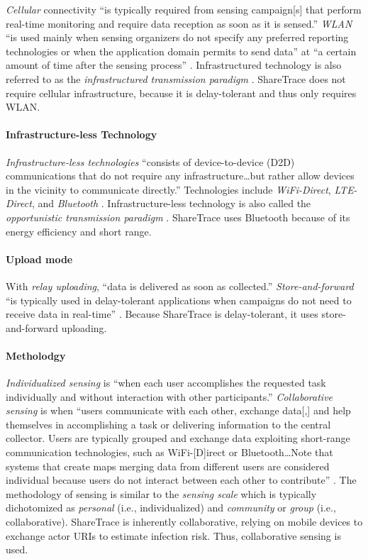 \emph{Cellular} connectivity ``is typically required from sensing campaign[s] that perform real-time monitoring and require data reception as soon as it is sensed.'' \emph{WLAN} ``is used mainly when sensing organizers do not specify any preferred reporting technologies or when the application domain permits to send data'' at ``a certain amount of time after the sensing process'' \citep{Capponi2019}. Infrastructured technology is also referred to as the \emph{infrastructured transmission paradigm} \citep{Ma2014}. ShareTrace does not require cellular infrastructure, because it is delay-tolerant and thus only requires WLAN.

\paragraph{Infrastructure-less Technology}

\emph{Infrastructure-less technologies} ``consists of device-to-device (D2D) communications that do not require any infrastructure{\ldots}but rather allow devices in the vicinity to communicate directly.'' Technologies include \emph{WiFi-Direct}, \emph{LTE-Direct}, and \emph{Bluetooth} \citep{Capponi2019}. Infrastructure-less technology is also called the \emph{opportunistic transmission paradigm} \citep{Ma2014}. ShareTrace uses Bluetooth because of its energy efficiency and short range.

\paragraph{Upload mode}

With \emph{relay uploading}, ``data is delivered as soon as collected.'' \emph{Store-and-forward} ``is typically used in delay-tolerant applications when campaigns do not need to receive data in real-time'' \citep{Capponi2019}. Because ShareTrace is delay-tolerant, it uses store-and-forward uploading.

\paragraph{Metholodgy}

\emph{Individualized sensing} is ``when each user accomplishes the requested task individually and without interaction with other participants.'' \emph{Collaborative sensing} is when ``users communicate with each other, exchange data[,] and help themselves in accomplishing a task or delivering information to the central collector. Users are typically grouped and exchange data exploiting short-range communication technologies, such as WiFi-[D]irect or Bluetooth{\ldots}Note that systems that create maps merging data from different users are considered individual because users do not interact between each other to contribute'' \citep{Capponi2019}. The methodology of sensing is similar to the \emph{sensing scale} which is typically dichotomized as \emph{personal} \citep{Lane2010, Ganti2011} (i.e., individualized) and \emph{community} \citep{Ganti2011} or \emph{group} \citep{Lane2010} (i.e., collaborative). ShareTrace is inherently collaborative, relying on mobile devices to exchange actor URIs to estimate infection risk. Thus, collaborative sensing is used.

